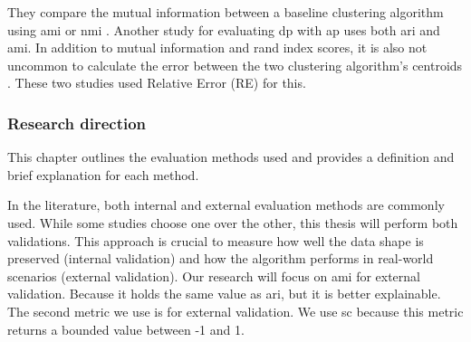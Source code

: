 They compare the mutual information between a baseline clustering algorithm using \gls{ami} \citep{9679364} or \gls{nmi} \citep{xia_distributed_2020,sun_privbv_2022}.
Another study for evaluating \gls{dp} with \gls{ap} uses both \gls{ari} and \gls{ami}.
In addition to mutual information and rand index scores, it is also not uncommon to calculate the error between the two clustering algorithm's centroids \citep{xia_distributed_2020, 9679364}.
These two studies used Relative Error (RE) for this.

\subsubsection{Research direction}
This chapter outlines the evaluation methods used and provides a definition and brief explanation for each method.

In the literature, both internal and external evaluation methods are commonly used.
While some studies choose one over the other, this thesis will perform both validations.
This approach is crucial to measure how well the data shape is preserved (internal validation) and how the algorithm performs in real-world scenarios (external validation).
Our research will focus on \gls{ami} for external validation. Because it holds the same value as \gls{ari}, but it is better explainable.
The second metric we use is for external validation. We use \gls{sc} because this metric returns a bounded value between -1 and 1.

